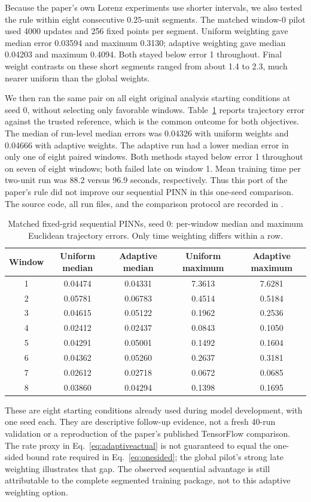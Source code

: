 \documentclass[11pt,a4paper]{article}
\begin{document}
Because the paper's own Lorenz experiments use shorter intervals, we also tested the rule within eight consecutive $0.25$-unit segments. The matched window-0 pilot used 4000 updates and 256 fixed points per segment. Uniform weighting gave median error 0.03594 and maximum 0.3130; adaptive weighting gave median 0.04203 and maximum 0.4094. Both stayed below error 1 throughout. Final weight contrasts on these short segments ranged from about 1.4 to 2.3, much nearer uniform than the global weights.

We then ran the same pair on all eight original analysis starting conditions at seed 0, without selecting only favorable windows. Table~\ref{tab:adaptive} reports trajectory error against the trusted reference, which is the common outcome for both objectives. The median of run-level median errors was 0.04326 with uniform weights and 0.04666 with adaptive weights. The adaptive run had a lower median error in only one of eight paired windows. Both methods stayed below error 1 throughout on seven of eight windows; both failed late on window 1. Mean training time per two-unit run was 88.2 versus 96.9 seconds, respectively. Thus this port of the paper's rule did not improve our sequential PINN in this one-seed comparison. The source code, all run files, and the comparison protocol are recorded in \cite{adaptiveprogress}.
\begin{table}[H]\centering\small
\caption{Matched fixed-grid sequential PINNs, seed 0: per-window median and maximum Euclidean trajectory errors. Only time weighting differs within a row.}\label{tab:adaptive}
\begin{tabular}{@{}ccccc@{}}\toprule
Window & Uniform median & Adaptive median & Uniform maximum & Adaptive maximum\\\midrule
1 & 0.04474 & 0.04331 & 7.3613 & 7.6281\\
2 & 0.05781 & 0.06783 & 0.4514 & 0.5184\\
3 & 0.04615 & 0.05122 & 0.1962 & 0.2536\\
4 & 0.02412 & 0.02437 & 0.0843 & 0.1050\\
5 & 0.04291 & 0.05001 & 0.1492 & 0.1604\\
6 & 0.04362 & 0.05260 & 0.2637 & 0.3181\\
7 & 0.02612 & 0.02718 & 0.0672 & 0.0685\\
8 & 0.03860 & 0.04294 & 0.1398 & 0.1695\\\bottomrule
\end{tabular}
\end{table}
These are eight starting conditions already used during model development, with one seed each. They are descriptive follow-up evidence, not a fresh 40-run validation or a reproduction of the paper's published TensorFlow comparison. The rate proxy in Eq.~\eqref{eq:adaptiveactual} is not guaranteed to equal the one-sided bound rate required in Eq.~\eqref{eq:onesided}; the global pilot's strong late weighting illustrates that gap. The observed sequential advantage is still attributable to the complete segmented training package, not to this adaptive weighting option.
\end{document}
